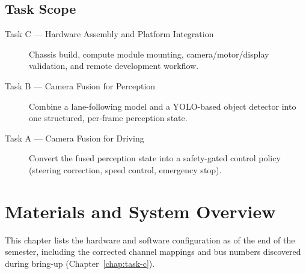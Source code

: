 \documentclass{imc-inf}
\begin{document}
\section{Task Scope}
\label{sec:task-scope}

\begin{description}
\item[Task C --- Hardware Assembly and Platform Integration]
Chassis build, compute module mounting, camera/motor/display validation, and
remote development workflow.
\item[Task B --- Camera Fusion for Perception]
Combine a lane-following model and a YOLO-based object detector \cite{redmon2016yolo,ultralytics_yolo} into one
structured, per-frame perception state.
\item[Task A --- Camera Fusion for Driving]
Convert the fused perception state into a safety-gated control policy
(steering correction, speed control, emergency stop).
\end{description}

\chapter{Materials and System Overview}
\label{chap:materials}

This chapter lists the hardware and software configuration as of the end of the
semester, including the corrected channel mappings and bus numbers discovered
during bring-up (Chapter~\ref{chap:task-c}).
\end{document}
